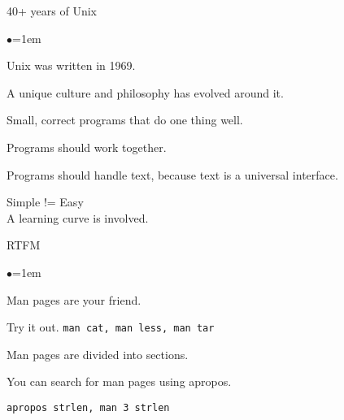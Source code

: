 \documentclass[xetex,serif,compress]{beamer}
\begin{document}
\newcommand{\mslide}[2]{
  \begin{frame}{#1}
    \begin{center}
      \begin{list}{$\bullet$}{\itemsep=1em}
        #2
      \end{list}
    \end{center}
  \end{frame}
}


\mslide{40+ years of Unix}{
\item Unix was written in 1969.
\item A unique culture and philosophy has evolved around it.
\item Small, correct programs that do one thing well.
\item Programs should work together.
\item Programs should handle text, because text is a universal interface.
}

\begin{frame}{}
  \begin{center}
    \huge
    Simple != Easy\\
    \vspace{2cm}
    \large
    A learning curve is involved.
  \end{center}
\end{frame}

\mslide{RTFM}{
\item Man pages are your friend.
\item Try it out. \texttt{man cat, man less, man tar}
\item Man pages are divided into sections.
\item You can search for man pages using apropos.
\item \texttt{apropos strlen, man 3 strlen}
}
\end{document}

